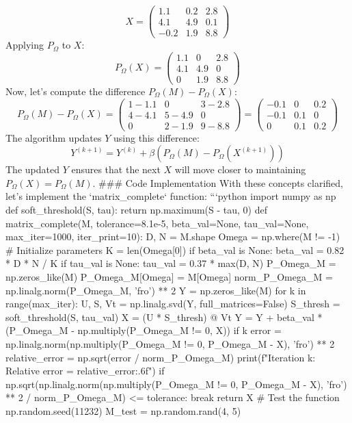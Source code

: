 \[ X = \begin{pmatrix}
1.1 & 0.2 & 2.8 \\
4.1 & 4.9 & 0.1 \\
-0.2 & 1.9 & 8.8
\end{pmatrix} \]
Applying \( P_\Omega \) to \( X \):
\[ P_\Omega(X) = \begin{pmatrix}
1.1 & 0 & 2.8 \\
4.1 & 4.9 & 0 \\
0 & 1.9 & 8.8
\end{pmatrix} \]
Now, let's compute the difference \( P_\Omega(M) - P_\Omega(X) \):
\[ P_\Omega(M) - P_\Omega(X) = \begin{pmatrix}
1 - 1.1 & 0 & 3 - 2.8 \\
4 - 4.1 & 5 - 4.9 & 0 \\
0 & 2 - 1.9 & 9 - 8.8
\end{pmatrix} = \begin{pmatrix}
-0.1 & 0 & 0.2 \\
-0.1 & 0.1 & 0 \\
0 & 0.1 & 0.2
\end{pmatrix} \]
The algorithm updates \( Y \) using this difference:
\[ Y^{(k+1)} = Y^{(k)} + \beta (P_\Omega(M) - P_\Omega(X^{(k+1)})) \]
The updated \( Y \) ensures that the next \( X \) will move closer to maintaining \( P_\Omega(X) = P_\Omega(M) \).
### Code Implementation
With these concepts clarified, let's implement the `matrix_complete` function:
```python
import numpy as np
def soft_threshold(S, tau):
return np.maximum(S - tau, 0)
def matrix_complete(M, tolerance=8.1e-5, beta_val=None, tau_val=None, max_iter=1000, iter_print=10):
D, N = M.shape
Omega = np.where(M != -1)
# Initialize parameters
K = len(Omega[0])
if beta_val is None:
beta_val = 0.82 * D * N / K
if tau_val is None:
tau_val = 0.37 * max(D, N)
P_Omega_M = np.zeros_like(M)
P_Omega_M[Omega] = M[Omega]
norm_P_Omega_M = np.linalg.norm(P_Omega_M, 'fro') ** 2
Y = np.zeros_like(M)
for k in range(max_iter):
U, S, Vt = np.linalg.svd(Y, full_matrices=False)
S_thresh = soft_threshold(S, tau_val)
X = (U * S_thresh) @ Vt
Y = Y + beta_val * (P_Omega_M - np.multiply(P_Omega_M != 0, X))
if k %
error = np.linalg.norm(np.multiply(P_Omega_M != 0, P_Omega_M - X), 'fro') ** 2
relative_error = np.sqrt(error / norm_P_Omega_M)
print(f"Iteration {k}: Relative error = {relative_error:.6f}")
if np.sqrt(np.linalg.norm(np.multiply(P_Omega_M != 0, P_Omega_M - X), 'fro') ** 2 / norm_P_Omega_M) <= tolerance:
break
return X
# Test the function
np.random.seed(11232)
M_test = np.random.rand(4, 5)
